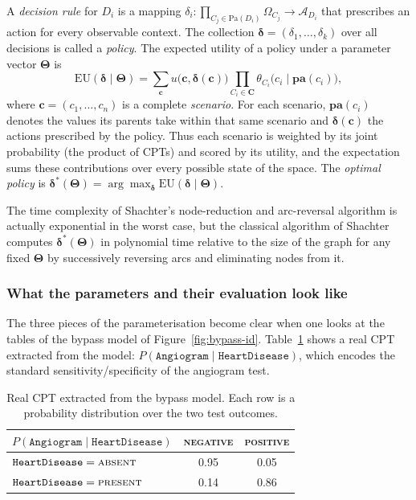 A \emph{decision rule} for $D_i$ is a mapping
$\delta_i : \prod_{C_j\in\mathrm{Pa}(D_i)}\Omega_{C_j}
\longrightarrow \mathcal{A}_{D_i}$
that prescribes an action for every observable context. The
collection $\boldsymbol{\delta}=(\delta_1,\ldots,\delta_k)$ over all
decisions is called a \emph{policy}. The expected utility of a
policy under a parameter vector $\boldsymbol{\Theta}$ is
\begin{equation}
\label{eq:eu}
   \mathrm{EU}(\boldsymbol{\delta}\mid\boldsymbol{\Theta}) =
   \sum_{\mathbf{c}} u\!\bigl(\mathbf{c},
                              \boldsymbol{\delta}(\mathbf{c})\bigr)
   \prod_{C_i\in\mathbf{C}}
   \theta_{C_i}\!\bigl(c_i \mid \mathbf{pa}(c_i)\bigr),
\end{equation}
where $\mathbf{c}=(c_1,\ldots,c_n)$ is a complete \emph{scenario}. For each scenario,
$\mathbf{pa}(c_i)$ denotes the values its parents take within that same
scenario and $\boldsymbol{\delta}(\mathbf{c})$ the actions prescribed
by the policy. Thus each scenario is weighted by its joint probability
(the product of CPTs) and scored by its utility, and the expectation
sums these contributions over every possible state of the space.
The \emph{optimal policy} is
$\boldsymbol{\delta}^{\!*}(\boldsymbol{\Theta}) =
\arg\max_{\boldsymbol{\delta}}
\mathrm{EU}(\boldsymbol{\delta}\mid\boldsymbol{\Theta})$.

\noindent The time complexity of Shachter’s node-reduction and arc-reversal algorithm is actually exponential in the worst case, but 
the classical algorithm of
Shachter~\cite{shachter1986evaluating} computes
$\boldsymbol{\delta}^{\!*}(\boldsymbol{\Theta})$ in polynomial time relative to the size of the graph for any fixed $\boldsymbol{\Theta}$ by successively reversing arcs
and eliminating nodes from it.

\subsubsection*{What the parameters and their evaluation look like}
\label{sec:bypass-tables}

The three pieces of the parameterisation become clear when one
looks at the tables of the bypass model of
Figure~\ref{fig:bypass-id}. Table~\ref{tab:bypass-cpt} shows a real
CPT extracted from the model: $P(\texttt{Angiogram}\mid
\texttt{HeartDisease})$, which encodes the standard
sensitivity/specificity of the angiogram test.

\begin{table}[h]
\centering\small
\begin{tabular}{l|cc}
\hline
$P(\texttt{Angiogram} \mid \texttt{HeartDisease})$
              & \textsc{negative} & \textsc{positive}\\
\hline
$\texttt{HeartDisease} = \textsc{absent}$  & 0.95 & 0.05\\
$\texttt{HeartDisease} = \textsc{present}$ & 0.14 & 0.86\\
\hline
\end{tabular}
\caption{Real CPT extracted from the bypass model.
Each row is a probability distribution over the two test outcomes.}
\label{tab:bypass-cpt}
\end{table}

